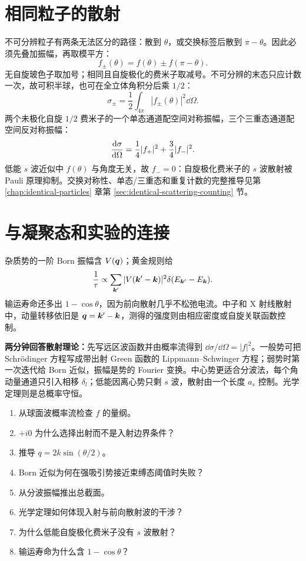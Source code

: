 \section{相同粒子的散射}
不可分辨粒子有两条无法区分的路径：散到 $\theta$，或交换标签后散到
$\pi-\theta$。因此必须先叠加振幅，再取模平方：
\[
f_\pm(\theta)=f(\theta)\pm f(\pi-\theta).
\]
无自旋玻色子取加号；相同且自旋极化的费米子取减号。不可分辨的末态只应计数一次，故可积半球，也可在全立体角积分后乘 $1/2$：
\[
\sigma_\pm
=\frac12\int_{4\pi}|f_\pm(\theta)|^2\dd\Omega.
\]
两个未极化自旋 $1/2$ 费米子的一个单态通道配空间对称振幅，三个三重态通道配空间反对称振幅：
\[
\frac{\mathrm d \sigma}{\mathrm d \Omega}
=\frac14|f_+|^2+\frac34|f_-|^2.
\]
低能 $s$ 波近似中 $f(\theta)$ 与角度无关，故
$f_-=0$：自旋极化费米子的 $s$ 波散射被 Pauli 原理抑制。交换对称性、单态/三重态和重复计数的完整推导见第
\ref{chap:identical-particles} 章第
\ref{sec:identical-scattering-counting} 节。

\section{与凝聚态和实验的连接}
杂质势的一阶 Born 振幅含 $V(\bm{q})$；黄金规则给
\[
\frac1\tau\propto\sum_{\bm{k}'}|V(\bm{k}'-\bm{k})|^2
\delta(E_{\bm{k}'}-E_{\bm{k}}).
\]
输运寿命还多出 $1-\cos\theta$，因为前向散射几乎不松弛电流。中子和 X 射线散射中，动量转移依旧是 $\bm{q}=\bm{k}'-\bm{k}$，测得的强度则由相应密度或自旋关联函数控制。

\begin{interviewbox}
\textbf{两分钟回答散射理论：}先写远区波函数并由概率流得到
$\dd\sigma/\dd\Omega=|f|^2$。一般势可把 Schrödinger 方程写成带出射 Green 函数的 Lippmann--Schwinger 方程；弱势时第一次迭代给 Born 近似，振幅是势的 Fourier 变换。中心势更适合分波法，每个角动量通道只引入相移 $\delta_l$；低能因离心势只剩 $s$ 波，散射由一个长度 $a_s$ 控制。光学定理则是总概率守恒。
\end{interviewbox}

\begin{selftestbox}
\begin{enumerate}
\item 从球面波概率流检查 $f$ 的量纲。
\item $+i0$ 为什么选择出射而不是入射边界条件？
\item 推导 $q=2k\sin(\theta/2)$。
\item Born 近似为何在强吸引势接近束缚态阈值时失败？
\item 从分波振幅推出总截面。
\item 光学定理如何体现入射与前向散射波的干涉？
\item 为什么低能自旋极化费米子没有 $s$ 波散射？
\item 输运寿命为什么含 $1-\cos\theta$？
\end{enumerate}
\end{selftestbox}
